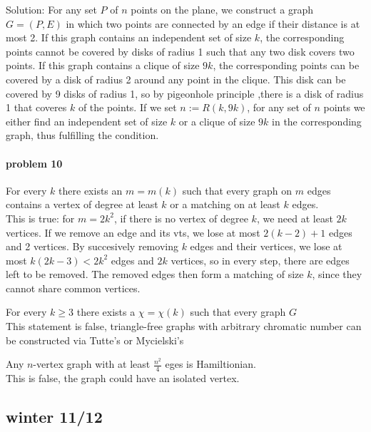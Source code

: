     \smallskip \noindent
    Solution: For any set $P$ of $n$ points on the plane, we construct a 
    graph $G = (P,E)$ in which two points are connected by an edge if their 
    distance is at most 2. If this graph contains an independent set of 
    size $k$, the corresponding points cannot be covered by disks of radius 
    1 such that any two disk covers two points. If this graph contains a 
    clique of size $9k$, the corresponding points can be covered by a disk 
    of radius 2 around any point in the clique. This disk can be covered 
    by 9 disks of radius 1, so by pigeonhole principle ,there is a disk of 
    radius 1 that coveres $k$ of the points. If we set $n:= R(k,9k)$, for 
    any set of $n$ points we either find an independent set of size $k$
    or a clique of size $9k$ in the corresponding graph, thus fulfilling the 
    condition.


\paragraph{problem 10} $ $\\
    For every $k$ there exists an $m = m(k)$ such that every graph on $m$ 
    edges contains a vertex of degree at least $k$ or a matching on at least 
    $k$ edges. \\
    This is true: for $m = 2k^2$, if there is no vertex of degree $k$, 
    we need at least $2k$ vertices. If we remove an edge and its vts, we 
    lose at most $2(k-2)+1$ edges and 2 vertices. By succesively removing
    $k$ edges and their vertices, we lose at most $k(2k-3) < 2k^2$ edges 
    and $2k$ vertices, so in every step, there are edges left to be removed.
    The removed edges then form a matching of size $k$, since they cannot 
    share common vertices.

    \bigskip \noindent
    For every $k\geq 3$ there exists a $\chi = \chi(k)$ such that every graph
    $G$ \\ This statement is false, triangle-free graphs with arbitrary 
    chromatic number can be constructed via Tutte's or Mycielski's

   \bigskip \noindent 
   Any $n$-vertex graph with at least $\frac{n^2}{4}$ eges is Hamiltionian.\\
   This is false, the graph could have an isolated vertex.



\subsection{winter 11/12}
